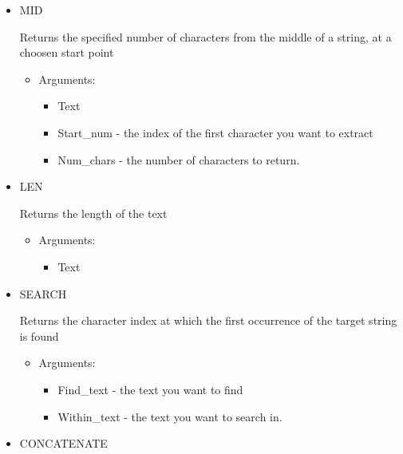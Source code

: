 \documentclass[8pt]{extarticle}
\begin{document}
\begin{multicols}{3}
\begin{itemize}
    \item MID
    
    Returns the specified number of characters from the middle of a string, at a choosen start point
    \begin{itemize}
        \item Arguments:
        \begin{itemize}
            \item Text
            \item Start\_num - the index of the first character you want to extract
            \item Num\_chars - the number of characters to return.
        \end{itemize}
    \end{itemize}
\end{itemize}

\begin{itemize}
    \item LEN
    
    Returns the length of the text
    \begin{itemize}
        \item Arguments:
        \begin{itemize}
            \item Text
        \end{itemize}
    \end{itemize}
\end{itemize}

\begin{itemize}
    \item SEARCH
    
    Returns the character index at which the first occurrence of the target string is found
    \begin{itemize}
        \item Arguments:
        \begin{itemize}
            \item Find\_text - the text you want to find
            \item Within\_text - the text you want to search in.
        \end{itemize}
    \end{itemize}
\end{itemize}

\columnbreak
\begin{itemize}
    \item CONCATENATE
    

\end{itemize}
\end{multicols}
\end{document}

